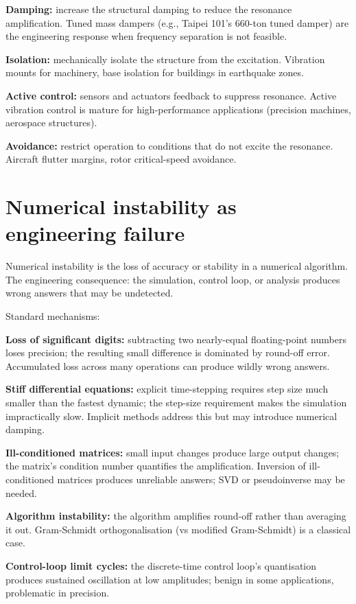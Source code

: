 \textbf{Damping:} increase the structural damping to reduce the resonance amplification. Tuned mass dampers (e.g., Taipei 101's $660$-ton tuned damper) are the engineering response when frequency separation is not feasible.

\textbf{Isolation:} mechanically isolate the structure from the excitation. Vibration mounts for machinery, base isolation for buildings in earthquake zones.

\textbf{Active control:} sensors and actuators feedback to suppress resonance. Active vibration control is mature for high-performance applications (precision machines, aerospace structures).

\textbf{Avoidance:} restrict operation to conditions that do not excite the resonance. Aircraft flutter margins, rotor critical-speed avoidance.

\section{Numerical instability as engineering failure}

Numerical instability is the loss of accuracy or stability in a numerical algorithm. The engineering consequence: the simulation, control loop, or analysis produces wrong answers that may be undetected.

Standard mechanisms:

\textbf{Loss of significant digits:} subtracting two nearly-equal floating-point numbers loses precision; the resulting small difference is dominated by round-off error. Accumulated loss across many operations can produce wildly wrong answers.

\textbf{Stiff differential equations:} explicit time-stepping requires step size much smaller than the fastest dynamic; the step-size requirement makes the simulation impractically slow. Implicit methods address this but may introduce numerical damping.

\textbf{Ill-conditioned matrices:} small input changes produce large output changes; the matrix's condition number quantifies the amplification. Inversion of ill-conditioned matrices produces unreliable answers; SVD or pseudoinverse may be needed.

\textbf{Algorithm instability:} the algorithm amplifies round-off rather than averaging it out. Gram-Schmidt orthogonalisation (vs modified Gram-Schmidt) is a classical case.

\textbf{Control-loop limit cycles:} the discrete-time control loop's quantisation produces sustained oscillation at low amplitudes; benign in some applications, problematic in precision.

